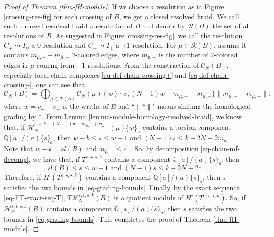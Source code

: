 \documentclass{amsart}
\theoremstyle{plain}
\theoremstyle{definition}
\theoremstyle{remark}
\numberwithin{equation}{section}
\begin{document}
\begin{proof}[Proof of Theorem \ref{thm-fH-module}]
If we choose a resolution as in Figure \ref{crossing-res-fig} for each crossing of $B$, we get a closed resolved braid. We call such a closed resolved braid a resolution of $B$ and denote by $\mathcal{R}(B)$ the set of all resolutions of $B$. As suggested in Figure \ref{crossing-res-fig}, we call the resolution $C_\pm \leadsto \Gamma_0$ a $0$-resolution and $C_\pm \leadsto \Gamma_1$ a $\pm 1$-resolution. For $\overline{\mu} \in \mathcal{R}(B)$, assume it contains $m_{\overline{\mu},+}+m_{\overline{\mu},-}$ $2$-colored edges, where $m_{\overline{\mu},\pm}$ is the number of $2$-colored edges in $\overline{\mu}$ coming from $\pm 1$-resolutions. From the construction of ${\mathcal{C}}_N(B)$, especially local chain complexes \eqref{eq-def-chain-crossing+} and \eqref{eq-def-chain-crossing-}, one can see that
\begin{equation}\label{eq-chain-mf-decomp}
{\mathcal{C}}_N(B) = \bigoplus_{\overline{\mu} \in \mathcal{R}(B)} {\mathcal{C}}_N(\overline{\mu}) \left\langle w \right\rangle \{w, (N-1)w + m_{\overline{\mu},+}-m_{\overline{\mu},-}\} \|m_{\overline{\mu},-}-m_{\overline{\mu},+}\|,
\end{equation}
where $w= c_+-c_-$ is the writhe of $B$ and ``$\|\ast\|$" means shifting the homological grading by $\ast$. From Lemma \ref{lemma-module-homology-resolved-braid}, we know that, if ${\mathcal{H}}_N^{{\varepsilon},\star,k-(N-1)w -m_{\overline{\mu},+}+m_{\overline{\mu},-}}(\overline{\mu})\{w\}_a$ contains a torsion component ${\mathbb{Q}}[a]/(a)\{s\}_a$, then $w-b \leq s \leq w-1$ and $(N-1)s \leq k - 2N +2m_{\overline{\mu},-}$. Note that $w-b=sl(B)$ and $m_{\overline{\mu},-} \leq c_-$. So, by decomposition \eqref{eq-chain-mf-decomp}, we have that, if $T^{{\varepsilon},\star,\star,k}$ contains a component ${\mathbb{Q}}[a]/(a)\{s\}_a$, then 
\begin{equation}\label{eq-grading-bounds}
sl(B) \leq s \leq w-1 \text{ and } (N-1)s \leq k - 2N +2c_-.
\end{equation}
Therefore, if $H^i(T^{{\varepsilon},\star,\star,k})$ contains a component ${\mathbb{Q}}[a]/(a)\{s\}_a$, then $s$ satisfies the two bounds in \eqref{eq-grading-bounds}. Finally, by the exact sequence \eqref{eq-FT-exact-seq-T}, $T{\mathcal{H}}_N^{{\varepsilon},i,\star,k}(B)$ is a quotient module of $ H^i(T^{{\varepsilon},\star,\star,k})$. So, if ${\mathcal{H}}_N^{{\varepsilon},i,\star,k}(B)$ contains a component ${\mathbb{Q}}[a]/(a)\{s\}_a$, then $s$ satisfies the two bounds in \eqref{eq-grading-bounds}. This completes the proof of Theorem \ref{thm-fH-module}.
\end{proof}
\end{document}

